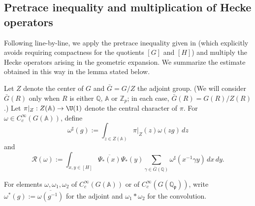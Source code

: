 \subsection{Pretrace inequality and multiplication of Hecke operators}\label{sec:pretr-ineq-mult-1}
Following \cite[\S6.3]{2020arXiv201202187N} line-by-line, we apply the pretrace inequality given in \cite[Lemma 5.5]{2020arXiv201202187N} (which explicitly avoids requiring compactness for the quotients $[G]$ and $[H]$) and multiply the Hecke operators arising in the geometric expansion.  We summarize the estimate obtained in this way in the lemma stated below.
\begin{notation}
  Let $Z$ denote the center of $G$ and $\bar{G} = G/Z$ the adjoint group.  (We will consider $\bar{G}(R)$ only when $R$ is either $\mathbb{Q}$, $\mathbb{A}$ or $\mathbb{Z}_p$; in each case, $\bar{G}(R) = G(R) / Z(R)$.)  Let $\pi|_Z : Z(\mathbb{A}) \rightarrow \U(1)$ denote the central character of $\pi$.  For $\omega \in C_c^\infty(G(\mathbb{A}))$, define
  \begin{equation*}
    \omega^\sharp(g) := \int_{z \in Z(\mathbb{A})} \pi|_Z(z) \omega(z g) \, d z
  \end{equation*}
  and
  \begin{equation*}
    \mathcal{R}(\omega) := \int_{x, y \in [H]} \overline{\Psi_{\ast}(x)} \Psi_{\ast}(y)
    \sum_{\gamma \in \bar{G}(\mathbb{Q})} \omega^\sharp(x^{-1} \gamma y) \, d x \, d y.
  \end{equation*}
\end{notation}
\begin{notation}\label{notation:convolve-adjoint-local-global-pretrace}
  For elements $\omega, \omega_1, \omega_2$ of $C_c^\infty(G(\mathbb{A}))$ or of $C_c^\infty(G(\mathbb{Q}_\mathfrak{p}))$, write $\omega^*(g) := \overline{\omega(g^{-1})}$ for the adjoint and $\omega_1 \ast \omega_2$ for the convolution.
\end{notation}
